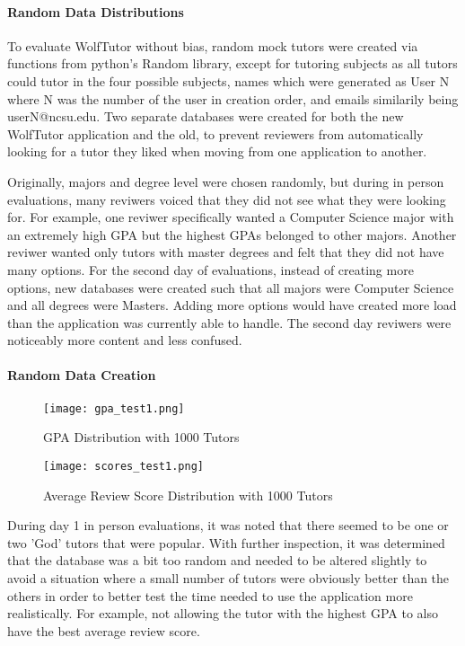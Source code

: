 \paragraph{Random Data Distributions}
To evaluate WolfTutor without bias, random mock tutors were 
created via functions from python's Random library, except for
tutoring subjects as all tutors could tutor in the four possible subjects,
names which were generated as User N where N was the number of the 
user in creation order, and emails similarily being userN@ncsu.edu. Two 
separate databases were created for both the new WolfTutor application
and the old, to prevent reviewers from automatically looking for a tutor
they liked when moving from one application to another.

Originally, majors and degree level were chosen randomly, but
during in person evaluations, many reviwers voiced that they did not
see what they were looking for. For example, one reviwer specifically wanted
a Computer Science major with an extremely high GPA but the highest GPAs 
belonged to other majors. Another reviwer wanted only tutors with master degrees
and felt that they did not have many options. For the second day of 
evaluations, instead of creating more options, new databases were created such that all majors
were Computer Science and all degrees were Masters. Adding more options
would have created more load than the application was currently able to handle.
The second day reviwers were noticeably more content and less confused.


\paragraph{Random Data Creation}

\begin{figure}[t]
\caption{GPA Distribution with 1000 Tutors}
\texttt{[image: gpa\_test1.png]}
\label{fig:gpa}
\end{figure}

\begin{figure}[t]
\caption{Average Review Score Distribution with 1000 Tutors}
\texttt{[image: scores\_test1.png]}
\label{fig:scores}
\end{figure}

During day 1 in person evaluations, it was noted that there
seemed to be one or two 'God' tutors that were popular. With
further inspection, it was determined that the database was a bit
too random and needed to be altered slightly to avoid a situation where a 
small number of tutors were obviously better than the others in order
to better test the time needed to use the application more realistically.
For example, not allowing the tutor with the highest GPA to also have the
best average review score.

